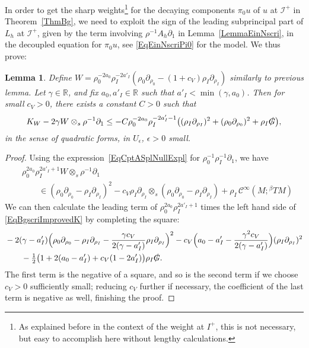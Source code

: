 \documentclass[reqno,11pt,letterpaper]{amsart}
\numberwithin{equation}{section}
\numberwithin{figure}{section}
\newtheorem{lemma}[thm]{Lemma}
\theoremstyle{definition}
\theoremstyle{remark}
\newcommand{\mc}{\mathcal}
\newcommand{\cC}{\mc C}
\newcommand{\ms}{\mathscr}
\newcommand{\scri}{\ms I}
\newcommand{\R}{\mathbb{R}}
\newcommand{\slG}{\slashed{G}{}}
\newcommand{\eps}{\epsilon}
\newcommand{\pa}{\partial}
\newcommand{\Tbeta}{{}^{\beta}T}
\newcommand{\half}{\tfrac{1}{2}}
\newcommand{\CI}{\cC^\infty}
\begin{document}
In order to get the sharp weights\footnote{As explained before in the context of the weight at $I^+$, this is not necessary, but easy to accomplish here without lengthy calculations.} for the decaying components $\pi_0 u$ of $u$ at $\scri^+$ in Theorem~\ref{ThmBg}, we need to exploit the sign of the leading subprincipal part of $L_h$ at $\scri^+$, given by the term involving $\rho^{-1}A_h\pa_1$ in Lemma~\ref{LemmaEinNscri}, in the decoupled equation for $\pi_0 u$, see \eqref{EqEinNscriPi0} for the model. We thus prove:
\begin{lemma}
\label{LemmaBgscriImprovedK}
  Define $W=\rho_0^{-2 a_0}\rho_I^{-2 a'_I}(\rho_0\pa_{\rho_0}-(1+c_V)\rho_I\pa_{\rho_I})$ similarly to previous lemma. Let $\gamma\in\R$, and fix $a_0,a'_I\in\R$ such that $a'_I<\min(\gamma,a_0)$. Then for small $c_V>0$, there exists a constant $C>0$ such that
  \begin{equation}
  \label{EqBgscriImprovedK}
    K_W - 2\gamma W\otimes_s \rho^{-1}\pa_1 \leq -C \rho_0^{-2 a_0}\rho_I^{-2 a'_I-1}\bigl((\rho_I\pa_{\rho_I})^2+(\rho_0\pa_{\rho_0})^2+\rho_I\slG\bigr),
  \end{equation}
  in the sense of quadratic forms, in $U_\eps$, $\eps>0$ small.
\end{lemma}
\begin{proof}
  Using the expression~\eqref{EqCptASplNullExpl} for $\rho_0^{-1}\rho_I^{-1}\pa_1$, we have
  \begin{align*}
    &\rho_0^{2 a_0}\rho_I^{2 a'_I+1}W\otimes_s\rho^{-1}\pa_1 \\
    &\qquad\in(\rho_0\pa_{\rho_0}-\rho_I\pa_{\rho_I})^2-c_V\rho_I\pa_{\rho_I}\otimes_s(\rho_0\pa_{\rho_0}-\rho_I\pa_{\rho_I}) + \rho_I\,\CI(M;\Tbeta M)
  \end{align*}
  We can then calculate the leading term of $\rho_0^{2 a_0}\rho_I^{2 a'_I+1}$ times the left hand side of \eqref{EqBgscriImprovedK} by completing the square:
  \begin{align*}
    &-2(\gamma-a'_I)\Bigl(\rho_0\pa_{\rho_0}-\rho_I\pa_{\rho_I}-\frac{\gamma c_V}{2(\gamma-a'_I)}\rho_I\pa_{\rho_I}\Bigr)^2 - c_V\Bigl(a_0-a'_I-\frac{\gamma^2 c_V}{2(\gamma-a'_I)}\Bigr)(\rho_I\pa_{\rho_I})^2 \\
    &\qquad - \half \bigl(1+2(a_0-a'_I)+c_V(1-2 a'_I)\bigr)\rho_I\slG.
  \end{align*}
  The first term is the negative of a square, and so is the second term if we choose $c_V>0$ sufficiently small; reducing $c_V$ further if necessary, the coefficient of the last term is negative as well, finishing the proof.
\end{proof}
\end{document}
